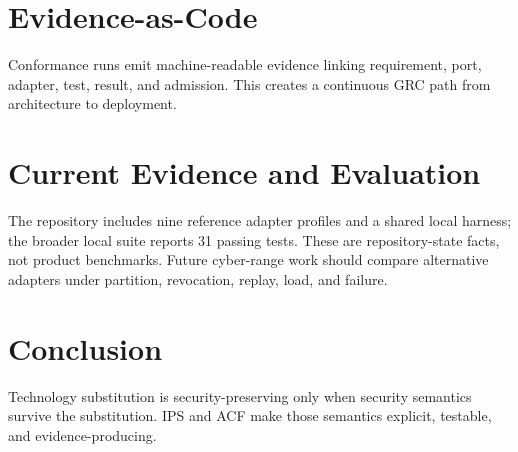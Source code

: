 \documentclass[11pt]{article}
\begin{document}
\section{Evidence-as-Code}
Conformance runs emit machine-readable evidence linking requirement, port, adapter, test, result, and admission. This creates a continuous GRC path from architecture to deployment.

\section{Current Evidence and Evaluation}
The repository includes nine reference adapter profiles and a shared local harness; the broader local suite reports 31 passing tests. These are repository-state facts, not product benchmarks. Future cyber-range work should compare alternative adapters under partition, revocation, replay, load, and failure.

\section{Conclusion}
Technology substitution is security-preserving only when security semantics survive the substitution. IPS and ACF make those semantics explicit, testable, and evidence-producing.
\end{document}
